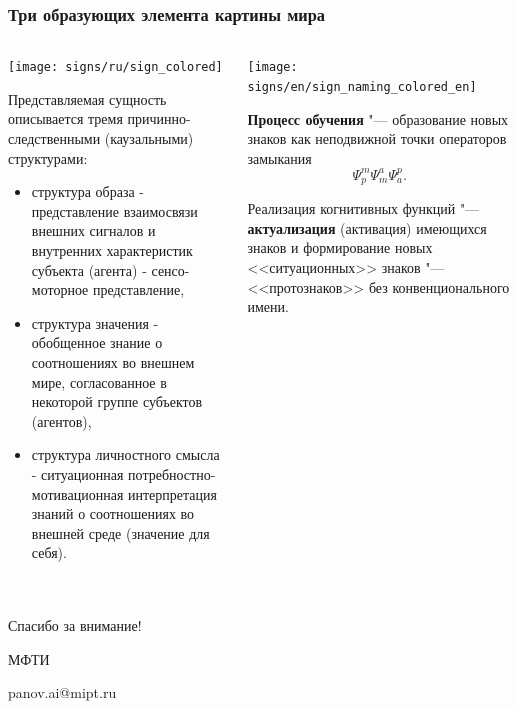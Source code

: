 \documentclass[default]{beamer}
\begin{document}
	\begin{frame}
		\frametitle{Три образующих элемента картины мира}
		\vspace{-15px}
		\scriptsize
		\begin{columns}
		\begin{column}{0.6\textwidth}
			\begin{center}
				\texttt{[image: signs/ru/sign\_colored]}
			\end{center}
			\vspace{-5pt}
			Представляемая сущность описывается тремя причинно-следственными (каузальными) структурами:
			\begin{itemize}
				\item {\color{red}структура образа} - представление взаимосвязи внешних сигналов и внутренних характеристик субъекта (агента) - сенсо-моторное представление,
				\item {\color{blue}структура значения} - обобщенное знание о соотношениях во внешнем мире, согласованное в некоторой группе субъектов (агентов),
				\item {\color{green!60!black}структура личностного смысла} - ситуационная потребностно-мотивационная интерпретация знаний о соотношениях во внешней среде (значение для себя).
			\end{itemize}
		\end{column}
		\begin{column}{0.4\textwidth}
			\begin{center}
				\texttt{[image: signs/en/sign\_naming\_colored\_en]}
			\end{center}
			\textbf{Процесс обучения} "--- образование новых знаков как неподвижной точки операторов замыкания 
			\[\Psi_p^m\Psi_m^a\Psi_a^p.\]
			\par\smallskip
			Реализация когнитивных функций "--- \textbf{актуализация} (активация) имеющихся знаков и формирование новых <<ситуационных>> знаков "--- <<протознаков>> без конвенционального имени.
		\end{column}
		\end{columns}
	\end{frame}	

	\section*{}
	{
	\setbeamertemplate{headline}{}
	\begin{frame}
		\centering
		\Huge
		Спасибо за внимание!
		\normalsize
		\par\bigskip
		\par\bigskip
		МФТИ
		
		\par\bigskip
		panov.ai@mipt.ru
	\end{frame}			
	}
\end{document}
